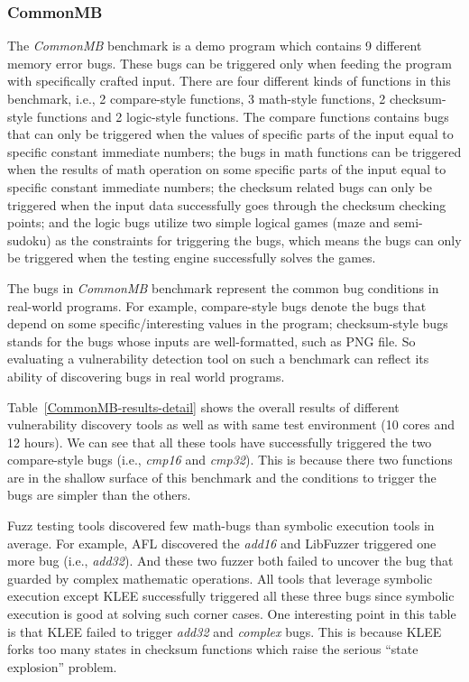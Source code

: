\subsubsection{CommonMB}
\noindent The \emph{CommonMB} benchmark is a demo program which contains 
9 different memory error bugs. These bugs can be triggered only when 
feeding the program with specifically crafted input. There are four 
different kinds of functions in this benchmark, i.e., 2 compare-style 
functions, 3 math-style functions, 2 checksum-style functions and 2 
logic-style functions. The compare functions contains bugs that can 
only be triggered when the values of specific parts of the input equal 
to specific constant immediate numbers; the bugs in math functions 
can be triggered when the results of math operation on some specific 
parts of the input equal to specific constant immediate numbers; the 
checksum related bugs can only be triggered when the input data 
successfully goes through the checksum checking points; and the logic 
bugs utilize two simple logical games (maze and semi-sudoku) as the 
constraints for triggering the bugs, which means the bugs can only be 
triggered when the testing engine successfully solves the games.

The bugs in \emph{CommonMB} benchmark represent the common bug conditions 
in real-world programs. For example, compare-style bugs denote the bugs 
that depend on some specific/interesting values in the program; 
checksum-style bugs stands for the bugs whose inputs are well-formatted, 
such as PNG file.
So evaluating a vulnerability detection tool on such a benchmark can 
reflect its ability of discovering bugs in real world programs.

Table~\ref{CommonMB-results-detail} shows the overall results of 
different vulnerability discovery tools as well as \prototype 
with same test environment (10 cores and 12 hours).
We can see that all these tools have successfully triggered the 
two compare-style bugs (i.e., \textit{cmp16} and \textit{cmp32}). 
This is because there two functions are in the shallow surface of 
this benchmark and the conditions to trigger the bugs are simpler 
than the others.  

Fuzz testing tools discovered few math-bugs than symbolic execution 
tools in average.
For example, AFL discovered the \textit{add16} and LibFuzzer triggered 
one more bug (i.e., \textit{add32}). And these two fuzzer both failed 
to uncover the bug that guarded by complex mathematic operations. 
All tools that leverage symbolic execution except KLEE successfully 
triggered all these three bugs since symbolic execution is good at 
solving such corner cases. One interesting point in this table is that 
KLEE failed to trigger \textit{add32} and \textit{complex} bugs. 
This is because KLEE forks too many states in checksum functions 
which raise the serious ``state explosion'' problem. 

